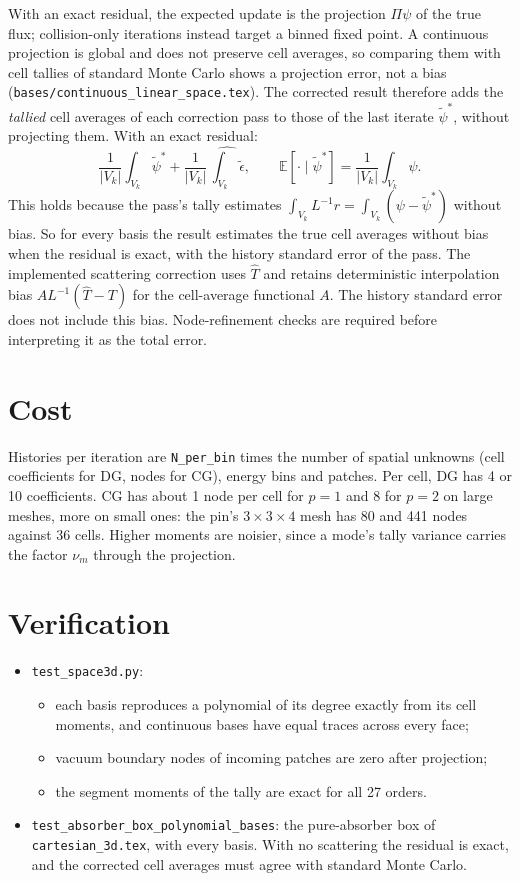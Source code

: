 \documentclass[11pt]{article}
\newcommand{\tpsi}{\tilde\psi}
\newcommand{\teps}{\tilde\epsilon}
\newcommand{\E}{\mathbb{E}}
\begin{document}
With an exact residual, the expected update is the projection $\Pi\psi$ of the
true flux; collision-only iterations instead target a binned fixed point. A continuous
projection is global and does not preserve cell averages, so comparing them with
cell tallies of standard Monte Carlo shows a projection error, not a bias
(\texttt{bases/continuous\_linear\_space.tex}). The corrected result therefore adds
the \emph{tallied} cell averages of each correction pass to those of the last
iterate $\tpsi^*$, without projecting them. With an exact residual:
\begin{equation}
  \frac{1}{|V_k|}\int_{V_k}\tpsi^* + \frac{1}{|V_k|}\,\widehat{\int_{V_k}\teps},\qquad
  \E[\cdot\mid\tpsi^*] = \frac{1}{|V_k|}\int_{V_k}\psi .
\end{equation}
This holds because the pass's tally estimates $\int_{V_k}L^{-1}r = \int_{V_k}(\psi -
\tpsi^*)$ without bias. So for every basis the result estimates the true cell averages
without bias when the residual is exact, with the history standard error of the pass.
The implemented scattering correction uses $\hat T$ and retains deterministic
interpolation bias $A L^{-1}(\hat T-T)$ for the cell-average functional $A$.
The history standard error does not include this bias. Node-refinement checks
are required before interpreting it as the total error.

\section{Cost}

Histories per iteration are \texttt{N\_per\_bin} times the number of spatial
unknowns (cell coefficients for DG, nodes for CG), energy bins and patches. Per
cell, DG has 4 or 10 coefficients. CG has about 1 node per cell for $p=1$ and 8 for
$p=2$ on large meshes, more on small ones: the pin's $3\times3\times4$ mesh has 80
and 441 nodes against 36 cells. Higher moments are noisier, since a mode's tally
variance carries the factor $\nu_m$ through the projection.

\section{Verification}

\begin{itemize}
  \item \texttt{test\_space3d.py}:
  \begin{itemize}
    \item each basis reproduces a polynomial of its degree exactly from its cell
    moments, and continuous bases have equal traces across every face;
    \item vacuum boundary nodes of incoming patches are zero after projection;
    \item the segment moments of the tally are exact for all 27 orders.
  \end{itemize}
  \item \texttt{test\_absorber\_box\_polynomial\_bases}: the pure-absorber box of
  \texttt{cartesian\_3d.tex}, with every basis. With no scattering the residual is
  exact, and the corrected cell averages must agree with standard Monte Carlo.
\end{itemize}
\end{document}
